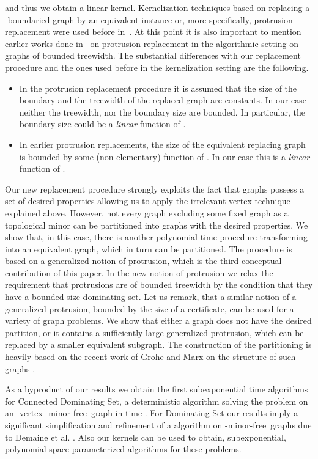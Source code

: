 \documentclass[11pt]{article}
\newcommand{\Hmf}{-minor-free}
\begin{document}
  and thus we obtain a linear kernel. 
  Kernelization techniques based on replacing a -boundaried graph by an equivalent instance or, more specifically, protrusion replacement were used before in~\cite{H.Bodlaender:2009ng,F.V.Fomin:2010oq,FominLMPS11, abs-1207-0835}. At this point it is also important to mention earlier works done in~\cite{FellowsL89,ArnborgCPS93,BodlaendervA01a,Fluiter97,BodlaenderH98}  
  on protrusion replacement in the algorithmic setting on graphs of bounded treewidth. 
  The substantial differences  with our replacement 
  procedure  and the ones used before in the kernelization setting are the following. 
  \begin{itemize}
  \item In the protrusion replacement procedure it is assumed that the size of the boundary  and the treewidth  of the replaced graph are constants. In our case neither the treewidth, nor the boundary size are  bounded. In particular, the boundary size  could be a {\em linear} function of .
  \item In earlier protrusion replacements, the size of the equivalent replacing graph is bounded by some (non-elementary) function of . In our case this is a {\sl linear} function of .  
  \end{itemize} 
Our new  replacement procedure strongly exploits the fact that graphs  possess 
 a set of desired properties allowing us to apply the irrelevant vertex technique explained above. 
However, not every graph  excluding some fixed graph   as a topological minor can be partitioned into graphs with the desired properties.  We show that, in this case, there is  another polynomial time procedure transforming  into an equivalent graph, which in turn can be partitioned. The procedure is based on a generalized notion of protrusion, which is the third conceptual contribution of this paper. In the new notion of protrusion we relax  the requirement that protrusions are of bounded treewidth by the condition   that they  have a bounded size dominating set. Let us remark, that a similar notion of a generalized protrusion, bounded by the size of a certificate, can be used  for a variety of graph problems. We show that
either   a graph does not have the desired partition, or  it   contains a  sufficiently large generalized protrusion, which can be replaced by a smaller equivalent subgraph.  
The construction of the partitioning  is heavily based on the recent work of Grohe and Marx on the structure of  such graphs  \cite{GroheM12}.


   As a byproduct of our results we  obtain the first subexponential time  algorithms for {\sc Connected Dominating Set}, a deterministic algorithm  solving the problem on an -vertex \Hmf \, graph in  time .  For {\sc Dominating Set} our results imply a significant 
simplification and refinement  of  a  algorithm on \Hmf \, graphs due to Demaine et al. \cite{DemaineFHT05sub}. 
Also our kernels can be used to obtain, subexponential, polynomial-space parameterized algorithms for these problems.    
\end{document}

